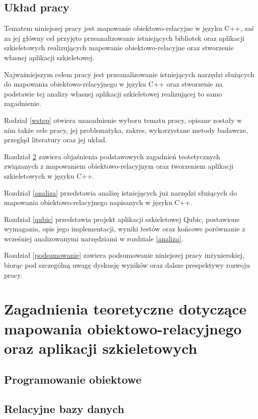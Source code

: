 \documentclass[12pt]{report}
\begin{document}
\section{Układ pracy} %

Tematem niniejszej pracy jest mapowanie obiektowo-relacyjne w języku C++, zaś za jej główny cel przyjęto przeanalizowanie istniejących bibliotek oraz aplikacji szkieletowych
realizujących mapowanie obiektowo-relacyjne oraz stworzenie własnej aplikacji szkieletowej.

Najważniejszym celem pracy jest przeanalizowanie istniejących narzędzi służących do mapowania obiektowo-relacyjnego w języku C++ oraz stworzenie na podstawie tej analizy
własnej aplikacji szkieletowej realizującej to samo zagadnienie.

Rodział \ref{wstep} otwiera uzasadnienie wyboru tematu pracy, opisane zostały w nim także cele pracy, jej problematyka, zakres, wykorzystane metody badawcze, prze\-gląd 
literatury oraz jej układ.

Rozdział \ref{teoria} zawiera objaśnienia podstawowych zagadnień teotetycznych związanych z mapowaniem obiektowo-relacyjnym oraz tworzeniem aplikacji szkieletowych w
języku C++.

Rozdział \ref{analiza} przedstawia analizę istniejących już narzędzi służących do mapowania obiektowo-relacyjnego napisanych w języku C++.

Rozdział \ref{qubic} przedstawia projekt aplikacji szkieletowej Qubic, postawione wymagania, opis jego implementacji, wyniki testów oraz końcowe porównanie z wcześniej
analizowanymi narzędziami w rozdziale \ref{analiza}.

Rozdział \ref{podsumowanie} zawiera podsumowanie niniejszej pracy inżynierskiej, biorąc pod szczególną uwagę dyskusję wyników oraz dalsze prespektywy rozwoju pracy.

\chapter[Zagadnienia teoretyczne]{Zagadnienia teoretyczne dotyczące mapowania obiektowo-relacyjnego oraz aplikacji szkieletowych}
\label{teoria}

\section{Programowanie obiektowe}

\section{Relacyjne bazy danych}
\end{document}
